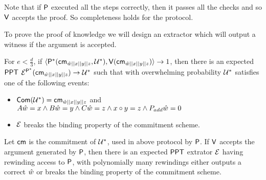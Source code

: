 Note that if $\mathsf{P}$ executed all the steps correctly, then it passes all the checks and so $\mathsf{V}$ accepts the proof. So completeness holds for the protocol.

To prove the proof of knowledge we will design an extractor which will output a witness if the argument is accepted.

\begin{theorem}
	For $e < \frac{d}{3}$, if $\langle \mathsf{P}^*(\mathsf{cm}_{\hat{w}||x||y||z}, \mathcal{U}^*),\mathsf{V}(\mathsf{cm}_{\hat{w}||x||y||z})\rangle \rightarrow 1$, then there is an expected $\mathsf{PPT}$ $\mathcal{E}^{\mathsf{P}^*}(\mathsf{cm}_{\hat{w}||x||y||z}) \rightarrow \mathcal{U}^*$ such that with overwhelming probability $\mathcal{U}^*$ satisfies one of the following events:
	\begin{itemize}
		\item $\mathsf{Com}(\mathcal{U}^*)=\mathsf{cm}_{\hat{w}||x||y||z}$ and $A\hat{w} = x \wedge B \hat{w} = y \wedge C \hat{w} = z \wedge x\circ y =z \wedge P_{add} \hat{w} = 0$
		\item $\mathcal{E}$ breaks the binding property of the commitment scheme.
		
	\end{itemize}
	Let $\mathsf{cm}$ is the commitment of $\mathcal{U}^*$, used in above protocol by $\mathsf{P}$. If $\mathsf{V}$ accepts the argument generated by $\mathsf{P}$, then there is an expected $\mathsf{PPT}$ extrator $\mathcal{E}$ having rewinding access to $\mathsf{P}$, with polynomially many rewindings either outputs a correct $\hat{w}$ or breaks the binding property of the commitment scheme.
\end{theorem}

